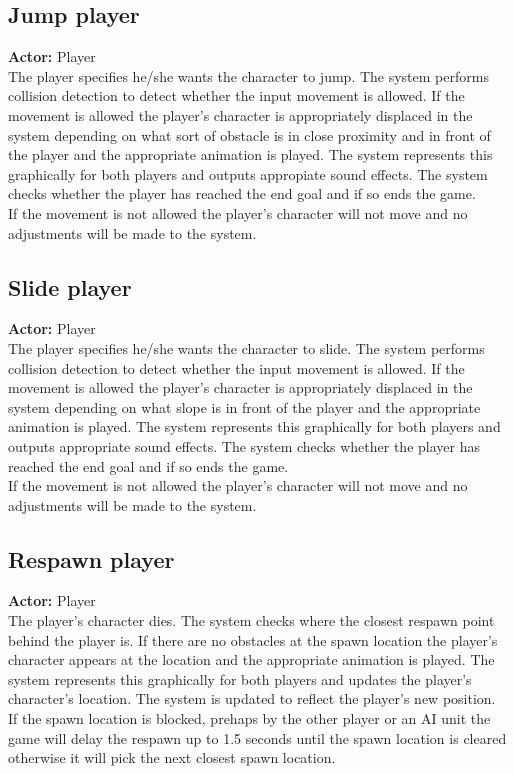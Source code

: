 \documentclass[a4paper,10pt]{article}
\begin{document}
\subsection{Jump player}
\textbf{Actor:} Player\smallskip\\
The player specifies he/she wants the character to jump. The system performs collision detection to detect whether the input movement is allowed. If the movement is allowed the player's character is appropriately displaced in the system depending on what sort of obstacle is in close proximity and in front of the player and the appropriate animation is played. The system represents this graphically for both players and outputs appropiate sound effects. The system checks whether the player has reached the end goal and if so ends the game.\smallskip\\
If the movement is not allowed the player's character will not move and no adjustments will be made to the system.

\subsection{Slide player}
\textbf{Actor:} Player\smallskip\\
The player specifies he/she wants the character to slide. The system performs collision detection to detect whether the input movement is allowed. If the movement is allowed the player's character is appropriately displaced in the system depending on what slope is in front of the player and the appropriate animation is played. The system represents this graphically for both players and outputs appropriate sound effects. The system checks whether the player has reached the end goal and if so ends the game.\smallskip\\
If the movement is not allowed the player's character will not move and no adjustments will be made to the system.

\subsection{Respawn player}
\textbf{Actor:} Player\smallskip\\
The player's character dies. The system checks where the closest respawn point behind the player is. If there are no obstacles at the spawn location the player's character appears at the location and the appropriate animation is played. The system represents this graphically for both players and updates the player's character's location.  The system is updated to reflect the player's new position.\smallskip\\
If the spawn location is blocked, prehaps by the other player or an AI unit the game will delay the respawn up to 1.5 seconds until the spawn location is cleared otherwise it will pick the next closest spawn location.
\end{document}
